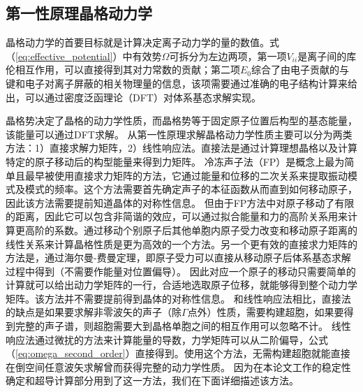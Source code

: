 \subsection{第一性原理晶格动力学}
晶格动力学的首要目标就是计算决定离子动力学的量的数值。式（\ref{eq:effective_potential}）中有效势$\Omega$可拆分为左边两项，第一项$V_{ii}$是离子间的库伦相互作用，可以直接得到其对力常数的贡献；第二项$E_0$综合了由电子贡献的与键和电子对离子屏蔽的相关物理量的信息，该项需要通过准确的电子结构计算来给出，可以通过密度泛函理论（DFT）对体系基态求解实现。

晶格势决定了晶格的动力学性质，而晶格势等于固定原子位置后构型的基态能量，该能量可以通过DFT求解。
从第一性原理求解晶格动力学性质主要可以分为两类方法\cite{fritsch1999density}：1）直接求解力矩阵，2）线性响应法。直接法是通过计算理想晶格以及计算特定的原子移动后的构型能量来得到力矩阵。
冷冻声子法（FP）是概念上最为简单且最早被使用直接求力矩阵的方法，它通过能量和位移的二次关系来提取振动模式及模式的频率\cite{yin1980microscopic}。这个方法需要首先确定声子的本征函数从而直到如何移动原子，因此该方法需要提前知道晶体的对称性信息。
但由于FP方法中对原子移动了有限的距离，因此它可以包含非简谐的效应，可以通过拟合能量和力的高阶关系用来计算更高阶的系数。通过移动个别原子后其他单胞内原子受力改变和移动原子距离的线性关系来计算晶格性质是更为高效的一个方法。另一个更有效的直接求力矩阵的方法是，通过海尔曼-费曼定理，即原子受力可以直接从移动原子后体系基态求解过程中得到（不需要作能量对位置偏导）。
因此对应一个原子的移动只需要简单的计算就可以给出动力学矩阵的一行，合适地选取原子位移，就能够得到整个动力学矩阵。该方法并不需要提前得到晶体的对称性信息。
和线性响应法相比，直接法的缺点是如果要求解非零波矢的声子（除$\Gamma$点外）性质，需要构建超胞，如果要得到完整的声子谱，则超胞需要大到晶格单胞之间的相互作用可以忽略不计\cite{frank1995ab,kresse1995ab}。
线性响应法通过微扰的方法来计算能量的导数，力学矩阵可以从二阶偏导，公式（\ref{eq:omega_second_order}）直接得到。使用这个方法，无需构建超胞就能直接在倒空间任意波矢求解曾而获得完整的动力学性质\cite{baroni2001phonons}。
因为在本论文工作的稳定性确定和超导计算部分用到了这一方法，我们在下面详细描述该方法。

